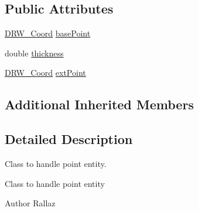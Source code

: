 \subsection*{Public Attributes}
\begin{DoxyCompactItemize}
\item 
\hyperlink{classDRW__Coord}{D\-R\-W\-\_\-\-Coord} \hyperlink{classDRW__Point_afaa15dc45c45d9057257e478c9746169}{base\-Point}
\item 
double \hyperlink{classDRW__Point_a909f6f2623e3b5cf40393636f3119954}{thickness}
\item 
\hyperlink{classDRW__Coord}{D\-R\-W\-\_\-\-Coord} \hyperlink{classDRW__Point_ab55e32170a648e8469844c886ff56fc7}{ext\-Point}
\end{DoxyCompactItemize}
\subsection*{Additional Inherited Members}


\subsection{Detailed Description}
Class to handle point entity. 

Class to handle point entity \begin{DoxyAuthor}{Author}
Rallaz 
\end{DoxyAuthor}


